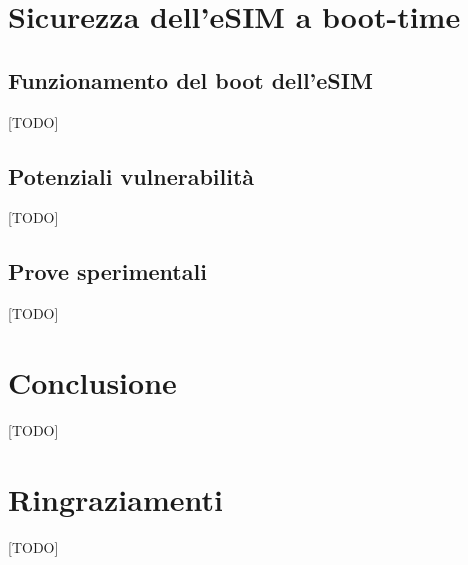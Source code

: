 \documentclass[10pt, twoside, openany]{book}
\begin{document}
\chapter{Sicurezza dell'eSIM a boot-time}
\section{Funzionamento del boot dell'eSIM}
[TODO]

\section{Potenziali vulnerabilità}
[TODO]

\section{Prove sperimentali}
[TODO]

\chapter{Conclusione}
[TODO]



\chapter*{Ringraziamenti}
[TODO]
\end{document}
